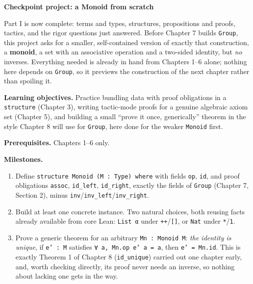 \begin{pblproject}
\label{sec:06-rigor-check:06-checkpoint-project:1}
\textbf{\large Checkpoint project: a Monoid from scratch}\par\smallskip


Part I is now complete: terms and types, structures, propositions and proofs, tactics, and the rigor questions just answered. Before Chapter 7 builds \texttt{Group}, this project asks for a smaller, self-contained version of exactly that construction, a \textbf{monoid}, a set with an associative operation and a two-sided identity, but \emph{no} inverses. Everything needed is already in hand from Chapters 1--6 alone; nothing here depends on \texttt{Group}, so it previews the construction of the next chapter rather than spoiling it.

\textbf{Learning objectives.} Practice bundling data with proof obligations in a \texttt{structure} (Chapter 3), writing tactic-mode proofs for a genuine algebraic axiom set (Chapter 5), and building a small ``prove it once, generically'' theorem in the style Chapter 8 will use for \texttt{Group}, here done for the weaker \texttt{Monoid} first.

\textbf{Prerequisites.} Chapters 1--6 only.

\textbf{Milestones.}

\begin{enumerate}
\def\labelenumi{\arabic{enumi}.}
\tightlist
\item
  Define \texttt{structure Monoid (M : Type) where} with fields \texttt{op}, \texttt{id}, and proof obligations \texttt{assoc}, \texttt{id\_\allowbreak{}left}, \texttt{id\_\allowbreak{}right}, exactly the fields of \texttt{Group} (Chapter 7, Section 2), minus \texttt{inv}/\texttt{inv\_\allowbreak{}left}/\texttt{inv\_\allowbreak{}right}.
\item
  Build at least one concrete instance. Two natural choices, both reusing facts already available from core Lean: \texttt{List α} under \texttt{++}/\texttt{[]}, or \texttt{Nat} under \texttt{*}/\texttt{1}.
\item
  Prove a generic theorem for an arbitrary \texttt{Mn : Monoid M}: \emph{the identity is unique}, if \texttt{e' : M} satisfies \texttt{∀ a, Mn.op e' a = a}, then \texttt{e' = Mn.id}. This is exactly Theorem 1 of Chapter 8 (\texttt{id\_\allowbreak{}unique}) carried out one chapter early, and, worth checking directly, its proof never needs an inverse, so nothing about lacking one gets in the way.
\end{enumerate}


\end{pblproject}
